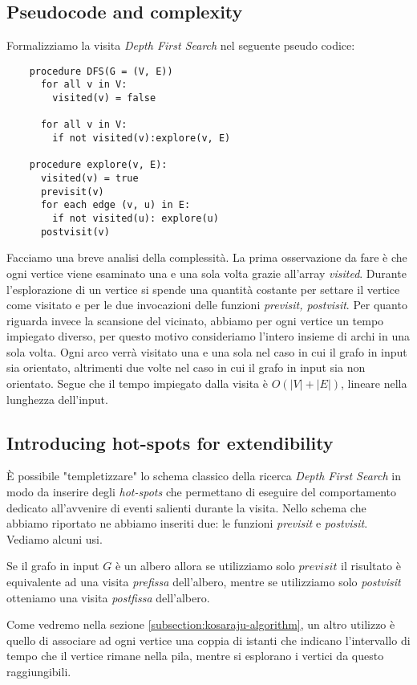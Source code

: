 \subsection{Pseudocode and complexity}
Formalizziamo la visita \emph{Depth First Search} nel seguente pseudo
codice:
\begin{lstlisting}
    procedure DFS(G = (V, E))
      for all v in V:
        visited(v) = false

      for all v in V:
        if not visited(v):explore(v, E)

    procedure explore(v, E):
      visited(v) = true
      previsit(v)
      for each edge (v, u) in E:
        if not visited(u): explore(u)
      postvisit(v)
\end{lstlisting}

Facciamo una breve analisi della complessit\`a. La prima osservazione
da fare \`e che ogni vertice viene esaminato una e una sola volta
grazie all'array \emph{visited}. Durante l'esplorazione di un vertice
si spende una quantit\`a costante per settare il vertice come visitato
e per le due invocazioni delle funzioni \emph{previsit,
  postvisit}. Per quanto riguarda invece la scansione del vicinato,
abbiamo per ogni vertice un tempo impiegato diverso, per questo motivo
consideriamo l'intero insieme di archi in una sola volta. Ogni arco
verr\`a visitato una e una sola nel caso in cui il grafo in input sia
orientato, altrimenti due volte nel caso in cui il grafo in input sia
non orientato. Segue che il tempo impiegato dalla visita \`e $O(|V| +
|E|)$, lineare nella lunghezza dell'input.

\subsection{Introducing hot-spots for extendibility}
\`E possibile "templetizzare" lo schema classico della ricerca
\emph{Depth First Search} in modo da inserire degli \emph{hot-spots}
che permettano di eseguire del comportamento dedicato all'avvenire di
eventi salienti durante la visita. Nello schema che abbiamo riportato
ne abbiamo inseriti due: le funzioni \emph{previsit} e
\emph{postvisit}. Vediamo alcuni usi.

Se il grafo in input $G$ \`e un albero allora se utilizziamo solo
$previsit$ il risultato \`e equivalente ad una visita \emph{prefissa}
dell'albero, mentre se utilizziamo solo \emph{postvisit} otteniamo una
visita \emph{postfissa} dell'albero.

Come vedremo nella sezione \ref{subsection:kosaraju-algorithm}, un
altro utilizzo \`e quello di associare ad ogni vertice una coppia di
istanti che indicano l'intervallo di tempo che il vertice rimane nella
pila, mentre si esplorano i vertici da questo raggiungibili.

